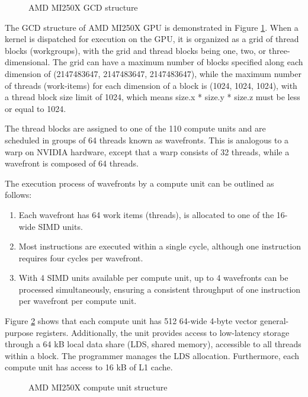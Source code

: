 \begin{figure}[H]
    \centering
    \caption{AMD MI250X GCD structure \cite{lumi}}
    \label{mi250x-gcd.svg}
\end{figure}

The GCD structure of AMD MI250X GPU is demonstrated in Figure \ref{mi250x-gcd.svg}. When a kernel is dispatched for execution on the GPU, it is organized as a grid of thread blocks (workgroups), with the grid and thread blocks being one, two, or three-dimensional. The grid can have a maximum number of blocks specified along each dimension of (2147483647, 2147483647, 2147483647), while the maximum number of threads (work-items) for each dimension of a block is (1024, 1024, 1024), with a thread block size limit of 1024, which means size.x * size.y * size.z must be less or equal to 1024.

The thread blocks are assigned to one of the 110 compute units and are scheduled in groups of 64 threads known as wavefronts. This is analogous to a warp on NVIDIA hardware, except that a warp consists of 32 threads, while a wavefront is composed of 64 threads.

The execution process of wavefronts by a compute unit can be outlined as follows:

\begin{enumerate}
    \item Each wavefront has 64 work items (threads), is allocated to one of the  16-wide SIMD units.
    \item Most instructions are executed within a single cycle, although one instruction requires four cycles per wavefront.
    \item With 4 SIMD units available per compute unit, up to 4 wavefronts can be processed simultaneously, ensuring a consistent throughput of one instruction per wavefront per compute unit.
\end{enumerate}

Figure \ref{mi250x-compute-unit.svg} shows that each compute unit has 512 64-wide 4-byte vector general-purpose registers. Additionally, the unit provides access to low-latency storage through a 64 kB local data share (LDS, shared memory), accessible to all threads within a block. The programmer manages the LDS allocation. Furthermore, each compute unit has access to 16 kB of L1 cache.

\begin{figure}[H]
    \centering
    \caption{AMD MI250X compute unit structure \cite{lumi}}
    \label{mi250x-compute-unit.svg}
\end{figure}

